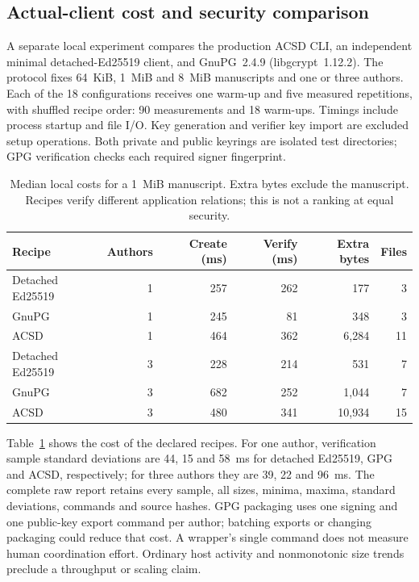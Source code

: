 \documentclass[acmsmall,screen,review,nonacm]{acmart}
\begin{document}
\subsection{Actual-client cost and security comparison}
\label{sec:comparison}

A separate local experiment compares the production ACSD CLI, an independent
minimal detached-Ed25519 client, and GnuPG~2.4.9 (libgcrypt~1.12.2).
The protocol fixes 64~KiB, 1~MiB and 8~MiB manuscripts and one or three authors.
Each of the 18 configurations receives one warm-up and five measured repetitions,
with shuffled recipe order: 90 measurements and 18 warm-ups. Timings include
process startup and file I/O. Key generation and verifier key import are
excluded setup operations. Both private and public keyrings are isolated test
directories; GPG verification checks each required signer fingerprint.

\begin{table}[t]
\centering\small
\begin{tabular}{lrrrrr}
\toprule
Recipe & Authors & Create (ms) & Verify (ms) & Extra bytes & Files \\
\midrule
Detached Ed25519 & 1 & 257 & 262 & 177 & 3 \\
GnuPG & 1 & 245 & 81 & 348 & 3 \\
ACSD & 1 & 464 & 362 & 6,284 & 11 \\
Detached Ed25519 & 3 & 228 & 214 & 531 & 7 \\
GnuPG & 3 & 682 & 252 & 1,044 & 7 \\
ACSD & 3 & 480 & 341 & 10,934 & 15 \\
\bottomrule
\end{tabular}
\caption{Median local costs for a 1~MiB manuscript. Extra bytes exclude the
manuscript. Recipes verify different application relations; this is not a
ranking at equal security.}
\label{tab:client-cost}
\end{table}

Table~\ref{tab:client-cost} shows the cost of the declared recipes.
For one author, verification sample standard deviations are 44, 15 and 58~ms
for detached Ed25519, GPG and ACSD, respectively; for three authors they are
39, 22 and 96~ms. The complete raw report retains every sample, all sizes,
minima, maxima, standard deviations, commands and source hashes.
GPG packaging uses one signing and one public-key export command per author;
batching exports or changing packaging could reduce that cost. A wrapper's
single command does not measure human coordination effort. Ordinary host
activity and nonmonotonic size trends preclude a throughput or scaling claim.
\end{document}
